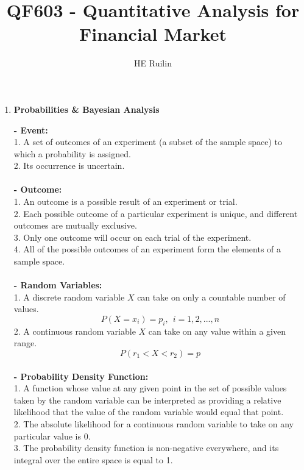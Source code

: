 \documentclass{article}
\title{\textbf{QF603 - Quantitative Analysis for Financial Market}}
\author{HE Ruilin}
\begin{document}
	\maketitle
\begin{enumerate}[S1 - ]
	\item \textbf{Probabilities \& Bayesian Analysis}\\\par
    \textbf{- Event:}\\
    1. A set of outcomes of an experiment (a subset of the sample space) to which a probability is assigned.\\
    2. Its occurrence is uncertain.\\
    \\
    \textbf{- Outcome:}\\
    1. An outcome is a possible result of an experiment or trial.\\
    2. Each possible outcome of a particular experiment is unique, and different outcomes are mutually exclusive.\\
    3. Only one outcome will occur on each trial of the experiment.\\
    4. All of the possible outcomes of an experiment form the elements of a sample space.\\
    \\
    \textbf{- Random Variables:}\\
    1. A discrete random variable $X$ can take on only a countable number of values.
    \begin{equation*}
    P(X = x_{i}) = p_{i}, \ \ i = 1,2,...,n
    \end{equation*}
    2. A continuous random variable $X$ can take on any value within a given range.
    \begin{equation*}
    P(r_{1} < X < r_{2}) = p
    \end{equation*}
    \\
    \textbf{- Probability Density Function:}\\
    1. A function whose value at any given point in the set of possible values taken by the random variable can be interpreted as providing a relative likelihood that the value of the random variable would equal that point.\\
    2. The absolute likelihood for a continuous random variable to take on any particular value is 0.\\
    3. The probability density function is non-negative everywhere, and its integral over the entire space is equal to 1.\\

\end{enumerate}
\end{document}
